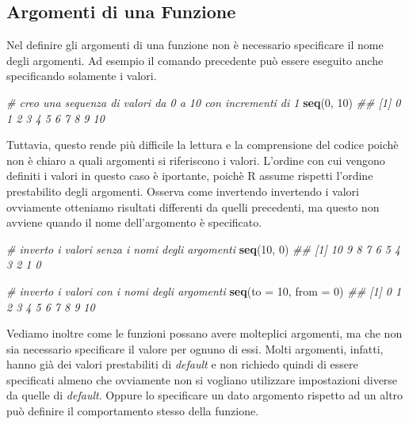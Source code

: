\documentclass[
]{book}
\newenvironment{Shaded}{\begin{snugshade}}{\end{snugshade}}
\newcommand{\CommentTok}[1]{\textcolor[rgb]{0.56,0.35,0.01}{\textit{#1}}}
\newcommand{\DataTypeTok}[1]{\textcolor[rgb]{0.13,0.29,0.53}{#1}}
\newcommand{\DecValTok}[1]{\textcolor[rgb]{0.00,0.00,0.81}{#1}}
\newcommand{\KeywordTok}[1]{\textcolor[rgb]{0.13,0.29,0.53}{\textbf{#1}}}
\newcommand{\NormalTok}[1]{#1}
\begin{document}
\hypertarget{argomenti-di-una-funzione}{%
\subsection{Argomenti di una Funzione}\label{argomenti-di-una-funzione}}

Nel definire gli argomenti di una funzione non è necessario specificare il nome degli argomenti. Ad esempio il comando precedente può essere eseguito anche specificando solamente i valori.

\begin{Shaded}
\begin{Highlighting}[]
\CommentTok{# creo una sequenza di valori da 0 a 10 con incrementi di 1}
\KeywordTok{seq}\NormalTok{(}\DecValTok{0}\NormalTok{, }\DecValTok{10}\NormalTok{)}
\CommentTok{##  [1]  0  1  2  3  4  5  6  7  8  9 10}
\end{Highlighting}
\end{Shaded}

Tuttavia, questo rende più difficile la lettura e la comprensione del codice poichè non è chiaro a quali argomenti si riferiscono i valori. L'ordine con cui vengono definiti i valori in questo caso è iportante, poichè R assume rispetti l'ordine prestabilito degli argomenti. Osserva come invertendo invertendo i valori ovviamente otteniamo risultati differenti da quelli precedenti, ma questo non avviene quando il nome dell'argomento è specificato.

\begin{Shaded}
\begin{Highlighting}[]
\CommentTok{# inverto i valori senza i nomi degli argomenti}
\KeywordTok{seq}\NormalTok{(}\DecValTok{10}\NormalTok{, }\DecValTok{0}\NormalTok{)}
\CommentTok{##  [1] 10  9  8  7  6  5  4  3  2  1  0}

\CommentTok{# inverto i valori con i nomi degli argomenti}
\KeywordTok{seq}\NormalTok{(}\DataTypeTok{to =} \DecValTok{10}\NormalTok{, }\DataTypeTok{from =} \DecValTok{0}\NormalTok{)}
\CommentTok{##  [1]  0  1  2  3  4  5  6  7  8  9 10}
\end{Highlighting}
\end{Shaded}

Vediamo inoltre come le funzioni possano avere molteplici argomenti, ma che non sia necessario specificare il valore per ognuno di essi. Molti argomenti, infatti, hanno già dei valori prestabiliti di \emph{default} e non richiedo quindi di essere specificati almeno che ovviamente non si vogliano utilizzare impostazioni diverse da quelle di \emph{default}. Oppure lo specificare un dato argomento rispetto ad un altro può definire il comportamento stesso della funzione.
\end{document}
